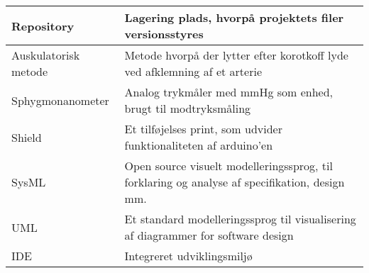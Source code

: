 \begin{longtable}{ |p{} |p{}| }
		\hline
		Repository & Lagering plads, hvorpå projektets filer versionsstyres \\
		\hline
		Auskulatorisk metode & Metode hvorpå der lytter efter korotkoff lyde ved afklemning af et arterie \\
		\hline
		Sphygmonanometer & Analog trykmåler med mmHg som enhed, brugt til modtryksmåling  \\
		\hline
		Shield & Et tilføjelses print, som udvider funktionaliteten af arduino'en \\
		\hline
		SysML & Open source visuelt modelleringssprog, til forklaring og analyse af specifikation, design mm.  \\
		\hline
		UML & Et standard modelleringssprog til visualisering af diagrammer for software design \\
		\hline
		IDE & Integreret udviklingsmiljø \\
		\hline
		
	\end{longtable}
\newpage
